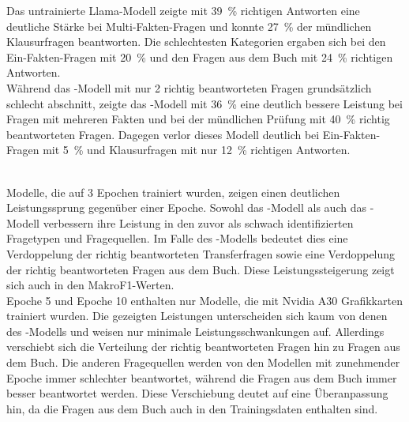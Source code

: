 Das untrainierte Llama-Modell zeigte mit \SI{39}{\percent} richtigen Antworten eine deutliche Stärke bei Multi-Fakten-Fragen und konnte \SI{27}{\percent} der mündlichen Klausurfragen beantworten.
Die schlechtesten Kategorien ergaben sich bei den Ein-Fakten-Fragen mit \SI{20}{\percent} und den Fragen aus dem Buch mit \SI{24}{\percent} richtigen Antworten.\\


Während das \liv-Modell mit nur 2 richtig beantworteten Fragen grundsätzlich schlecht abschnitt,
zeigte das \lia-Modell mit \SI{36}{\percent} eine deutlich bessere Leistung bei Fragen mit mehreren Fakten
und bei der mündlichen Prüfung mit \SI{40}{\percent} richtig beantworteten Fragen.
Dagegen verlor dieses Modell deutlich bei Ein-Fakten-Fragen mit \SI{5}{\percent} und Klausurfragen mit nur \SI{12}{\percent} richtigen Antworten.\\\


Modelle, die auf 3 Epochen trainiert wurden, zeigen einen deutlichen Leistungssprung gegenüber einer Epoche.
Sowohl das \lev-Modell als auch das \lea-Modell verbessern ihre Leistung in den zuvor als schwach identifizierten Fragetypen und Fragequellen.
Im Falle des \lea-Modells bedeutet dies eine Verdoppelung der richtig beantworteten Transferfragen sowie eine Verdoppelung der richtig beantworteten Fragen aus dem Buch.
Diese Leistungssteigerung zeigt sich auch in den MakroF1-Werten.\\

Epoche 5 und Epoche 10 enthalten nur Modelle, die mit Nvidia A30 Grafikkarten trainiert wurden.
Die gezeigten Leistungen unterscheiden sich kaum von denen des \lea-Modells und weisen nur minimale Leistungsschwankungen auf.
Allerdings verschiebt sich die Verteilung der richtig beantworteten Fragen hin zu Fragen aus dem Buch.
Die anderen Fragequellen werden von den Modellen mit zunehmender Epoche immer schlechter beantwortet, während die Fragen aus dem Buch immer besser beantwortet werden.
Diese Verschiebung deutet auf eine Überanpassung hin, da die Fragen aus dem Buch auch in den Trainingsdaten enthalten sind.\\

